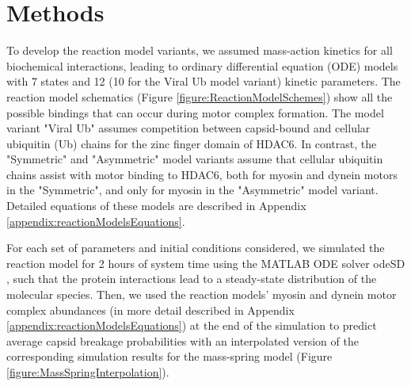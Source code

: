 \section{Methods}
\label{ch:ReactionModelsMethods}

To develop the reaction model variants, we assumed mass-action kinetics for all biochemical interactions, leading to ordinary differential equation (ODE) models with 7 states and 12 (10 for the Viral Ub model variant) kinetic parameters. The reaction model schematics (Figure \ref{figure:ReactionModelSchemes}) show all the possible bindings that can occur during motor complex formation. The model variant "Viral Ub" assumes competition between capsid-bound and cellular ubiquitin (Ub) chains for the zinc finger domain of HDAC6. In contrast, the "Symmetric" and "Asymmetric" model variants assume that cellular ubiquitin chains assist with motor binding to HDAC6, both for myosin and dynein motors in the "Symmetric", and only for myosin in the "Asymmetric" model variant. Detailed equations of these models are described in Appendix \ref{appendix:reactionModelsEquations}.

For each set of parameters and initial conditions considered, we simulated the reaction model for 2 hours of system time using the MATLAB ODE solver odeSD \cite{gonnet2012specialized}, such that the protein interactions lead to a steady-state distribution of the molecular species. Then, we used the reaction models' myosin and dynein motor complex abundances (in more detail described in Appendix \ref{appendix:reactionModelsEquations}) at the end of the simulation to predict average capsid breakage probabilities with an interpolated version of the corresponding simulation results for the mass-spring model (Figure \ref{figure:MassSpringInterpolation}).

